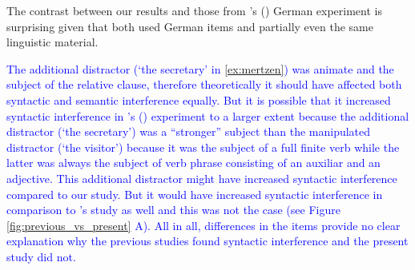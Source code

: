 \documentclass[a4paper, man, floatsintext]{apa7}
\begin{document}
The contrast between our results and those from  \citeauthor{mertzen}'s (\citeyear{mertzen}) German experiment is surprising given that both used German items and partially even the same linguistic material. 

\textcolor{blue}{The additional distractor (`the secretary' in \ref{ex:mertzen}) was animate and the subject of the relative clause, therefore theoretically it should have affected both syntactic and semantic interference equally. But it is possible that it increased syntactic interference in \citeauthor{mertzen}'s (\citeyear{mertzen}) experiment to a larger extent because the additional distractor (`the secretary') was a ``stronger'' subject than the manipulated distractor (`the visitor') because it was the subject of a full finite verb while the latter was always the subject of verb phrase consisting of an auxiliar and an adjective. This additional distractor might have increased syntactic interference compared to our study. But it would have increased syntactic interference in comparison to \citeauthor{vandyke07}'s study as well and this was not the case (see Figure \ref{fig:previous_vs_present} A).}\label{items_mertzen} \textcolor{blue}{All in all, differences in the items provide no clear explanation why the previous studies found syntactic interference and the present study did not.}
\end{document}
